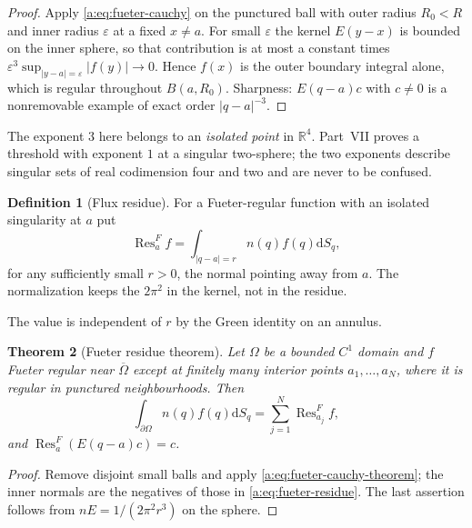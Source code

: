 \documentclass[11pt,a4paper]{article}
\numberwithin{equation}{section}
\newtheorem{theorem}{Theorem}[section]
\theoremstyle{definition}
\newtheorem{definition}[theorem]{Definition}
\theoremstyle{remark}
\theoremstyle{plain}
\newcommand{\RR}{\mathbb R}
\newcommand{\Om}{\Omega}
\newcommand{\abs}[1]{\lvert #1\rvert}
\newcommand{\dd}{\mathrm d}
\newcommand{\Res}{\operatorname{Res}}
\begin{document}
\begin{proof}
Apply \eqref{a:eq:fueter-cauchy} on the punctured ball with outer radius
$R_0<R$ and inner radius $\varepsilon$ at a fixed $x\ne a$. For small
$\varepsilon$ the kernel $E(y-x)$ is bounded on the inner sphere, so that
contribution is at most a constant times
$\varepsilon^3\sup_{\abs{y-a}=\varepsilon}\abs{f(y)}\to0$. Hence $f(x)$ is the
outer boundary integral alone, which is regular throughout $B(a,R_0)$.
Sharpness: $E(q-a)c$ with $c\ne0$ is a nonremovable example of exact order
$\abs{q-a}^{-3}$.
\end{proof}

The exponent $3$ here belongs to an \emph{isolated point} in $\RR^4$. Part~VII
proves a threshold with exponent $1$ at a singular two-sphere; the two
exponents describe singular sets of real codimension four and two and are
never to be confused.

\begin{definition}[Flux residue]
\label{a:def:flux-residue}
For a Fueter-regular function with an isolated singularity at $a$ put
\begin{equation}
 \Res^{F}_af=\int_{\abs{q-a}=r}n(q)f(q)\dd S_q ,
 \label{a:eq:fueter-residue}
\end{equation}
for any sufficiently small $r>0$, the normal pointing away from $a$. The
normalization keeps the $2\pi^2$ in the kernel, not in the residue.
\end{definition}

The value is independent of $r$ by the Green identity on an annulus.

\begin{theorem}[Fueter residue theorem]
\label{a:thm:fueter-residue}
Let $\Om$ be a bounded $C^1$ domain and $f$ Fueter regular near
$\overline\Om$ except at finitely many interior points $a_1,\dots,a_N$, where
it is regular in punctured neighbourhoods. Then
\begin{equation}
 \int_{\partial\Om}n(q)f(q)\dd S_q=\sum_{j=1}^N\Res^F_{a_j}f ,
 \label{a:eq:fueter-residue-theorem}
\end{equation}
and $\Res^F_a(E(q-a)c)=c$.
\end{theorem}

\begin{proof}
Remove disjoint small balls and apply
\eqref{a:eq:fueter-cauchy-theorem}; the inner normals are the negatives of
those in \eqref{a:eq:fueter-residue}. The last assertion follows from
$nE=1/(2\pi^2r^3)$ on the sphere.
\end{proof}
\end{document}
